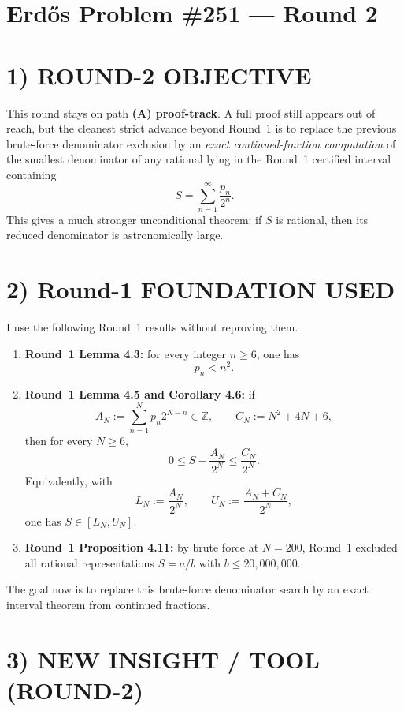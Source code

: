 \section*{Erd\H{o}s Problem \#251 --- Round 2}

\section*{1) ROUND-2 OBJECTIVE}

This round stays on path \textbf{(A) proof-track}. A full proof still appears out of reach, but the cleanest strict advance beyond Round~1 is to replace the previous brute-force denominator exclusion by an \emph{exact continued-fraction computation} of the smallest denominator of any rational lying in the Round~1 certified interval containing
\[
S=\sum_{n=1}^{\infty}\frac{p_n}{2^n}.
\]
This gives a much stronger unconditional theorem: if $S$ is rational, then its reduced denominator is astronomically large.

\section*{2) Round-1 FOUNDATION USED}

I use the following Round~1 results without reproving them.

\begin{enumerate}
\item \textbf{Round~1 Lemma 4.3:} for every integer $n\ge 6$, one has
\[
p_n<n^2.
\]

\item \textbf{Round~1 Lemma 4.5 and Corollary 4.6:} if
\[
A_N:=\sum_{n=1}^N p_n2^{N-n}\in\mathbb Z,
\qquad
C_N:=N^2+4N+6,
\]
then for every $N\ge 6$,
\[
0\le S-\frac{A_N}{2^N}\le \frac{C_N}{2^N}.
\]
Equivalently, with
\[
L_N:=\frac{A_N}{2^N},
\qquad
U_N:=\frac{A_N+C_N}{2^N},
\]
one has $S\in [L_N,U_N]$.

\item \textbf{Round~1 Proposition 4.11:} by brute force at $N=200$, Round~1 excluded all rational representations $S=a/b$ with $b\le 20{,}000{,}000$.
\end{enumerate}

The goal now is to replace this brute-force denominator search by an exact interval theorem from continued fractions.

\section*{3) NEW INSIGHT / TOOL (ROUND-2)}

